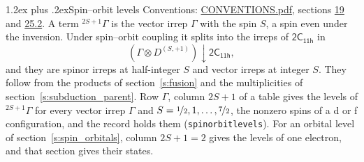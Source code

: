 \documentclass[10pt,a4paper]{article}
\makeatletter
\renewcommand\section{\@startsection{section}{1}{\z@}{-3ex plus -1ex minus -.2ex}%
  {1.2ex plus .2ex}{\normalfont\large\sffamily\bfseries\color{parttitle}}}
\numberwithin{equation}{section}
\newcommand{\grp}[1]{\mathsf{#1}}
\newcommand{\restr}[2]{#1\!\downarrow#2}
\newcommand{\irrJp}[2]{D^{(#1,#2)}}
\newcommand{\irrprod}{\otimes}
\newcommand{\term}[2]{{}^{#1}#2}
\makeatother
\begin{document}
\section{Spin--orbit levels}\label{s:spin_orbit}
Conventions: \href{../../CONVENTIONS.pdf}{CONVENTIONS.pdf}, sections \href{../../../rotation/CONVENTIONS.pdf\#conv.19}{19} and \href{../../CONVENTIONS.pdf\#conv.25.2}{25.2}.
\leavevmode\label{n:local.spin}\label{n:symbol.term}A term $\term{2S+1}{\Gamma}$ is the vector irrep $\Gamma$ with the spin $S$, a spin even under the inversion. Under spin--orbit coupling it splits into the irreps of $\grp{2C_{11h}}$ in
\begin{equation}\label{e:spinorbit}\restr{(\Gamma \irrprod \irrJp{S}{+1})}{\grp{2C_{11h}}},\end{equation}
and they are spinor irreps at half-integer $S$ and vector irreps at integer $S$. They follow from the products of section~\ref{s:fusion} and the multiplicities of section~\ref{s:subduction_parent}. Row $\Gamma$, column $2S + 1$ of a table gives the levels of $\term{2S+1}{\Gamma}$ for every vector irrep $\Gamma$ and $S = \nicefrac{1}{2}, 1, \dots, \nicefrac{7}{2}$, the nonzero spins of a d or f configuration, and the record holds them (\texttt{spinorbitlevels}). For an orbital level of section~\ref{s:spin_orbitals}, column $2S + 1 = 2$ gives the levels of one electron, and that section gives their states.
\end{document}
